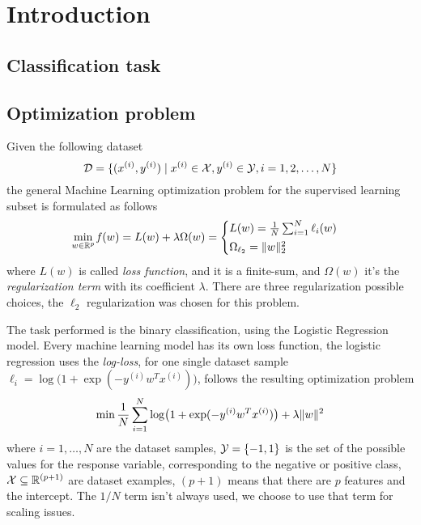 \section{Introduction}\label{sc:intro}


\subsection{Classification task}

\subsection{Optimization problem}

Given the following dataset
\[
\mathcal{D}=\{(x^{(i)}, y^{(i)})\mid x^{(i)}\in\mathcal{X}, y^{(i)}\in\mathcal{Y}, i=1,2,\dots,N\}
\]
the general Machine Learning optimization problem for the supervised learning subset is formulated as follows
\[
\min_{w\in\mathbb{R}^p}\operatorname*{\mathit{f}}(w)=L(w)+\lambda\Omega(w)=
\begin{cases}
L(w)=\frac{1}{N}\sum_{i=1}^N\ell_i(w) \\[0.5ex]
\Omega_{\ell_2}=\lVert w\rVert_2^2
\end{cases}
\]
where $L(w)$ is called \emph{loss function}, and it is a finite-sum, and $\Omega(w)$ it's the \emph{regularization term} with its coefficient $\lambda$. There are three regularization possible choices, the $\ell_2$ regularization was chosen for this problem.

The task performed is the binary classification, using the Logistic Regression model. Every machine learning model has its own loss function, the logistic regression uses the \emph{log-loss}, for one single dataset sample $\ell_i=\log\bigl(1+\exp(-y^{(i)}w^Tx^{(i)})\bigr)$, follows the resulting optimization problem
\begin{equation}\label{eq:opt-prob}
\min\frac{1}{N}\sum_{i=1}^N\log\bigl(1+\exp(-y^{(i)}w^Tx^{(i)})\bigr)+\lambda\lVert w\rVert^2
\end{equation}
where $i=1,\dots,N$ are the dataset samples, $\mathcal{Y}=\{-1,1\}$ is the set of the possible values for the response variable, corresponding to the negative or positive class, $\mathcal{X}\subseteq\mathbb{R}^{(p+1)}$ are dataset examples, $(p+1)$ means that there are $p$ features and the intercept. The $1/N$ term isn't always used, we choose to use that term for scaling issues.

